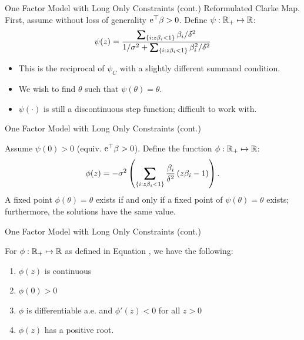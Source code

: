 \documentclass[11pt,leqno]{beamer}
\begin{document}
\begin{frame}{One Factor Model with Long Only Constraints (cont.)}
Reformulated Clarke Map.  First, assume without loss of generality $\mathrm{e}^\top \beta>0$.  Define $\psi: \mathbb{R}_+  \mapsto \mathbb{R}$:
\begin{equation}\label{psieq}
\psi(z) = \frac{\sum_{\{i:z\gb_i<1\}} \gb_i/\gd^2}{1/\gs^2+ \sum_{ \{i:z\gb_i<1\} } \gb_i^2/\gd^2}
\end{equation}
\begin{itemize}
\item This is the reciprocal of $\psi_C$ with a slightly different summand condition.
\item We wish to find $\theta$ such that $\psi(\theta) = \theta$.  
\item$\psi(\cdot)$ is still a discontinuous step function; difficult to work with.
\end{itemize}
\end{frame}


\begin{frame}{One Factor Model with Long Only Constraints (cont.)}
\begin{lemma} Assume $\psi(0)>0$ (equiv. $\mathrm{e}^\top \beta>0$).  Define the function $\phi: \mathbb{R}_+ \mapsto \mathbb{R}$:
\begin{equation}\label{phi}
\phi(z) = -\gs^2\paren{ \sum_{\{i:z\gb_i<1\}} \frac{\gb_i}{\gd^2}\paren{z \gb_i-1}}.
\end{equation}
A fixed point $\phi(\theta) = \theta$ exists if and only if a fixed point of $\psi(\theta) = \theta$ exists; furthermore, the solutions have the same value.
\end{lemma}
\end{frame}

\begin{frame}{One Factor Model with Long Only Constraints (cont.)}
\begin{lemma}
For $\phi:\mathbb{R}_+ \mapsto \mathbb{R}$ as defined in Equation , we have the following:
\begin{enumerate}
\item $\phi(z)$ is continuous
\item $\phi(0)>0$
\item $\phi$ is differentiable a.e. and $\phi'(z)<0$ for all $z>0$
\item $\phi(z)$ has a positive root.
\end{enumerate}
\end{lemma}
\end{frame}
\end{document}
